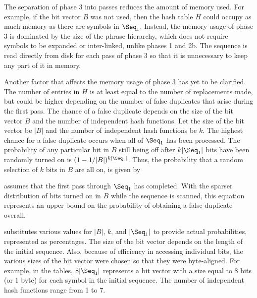 The separation of phase 3 into passes reduces the amount of
memory used.  For example, if the bit vector $B$ was not used,
then the hash table $H$ could occupy as much memory as 
there are symbols in $\Seq_1$.  Instead, the memory usage of
phase 3 is dominated by the size of the phrase hierarchy,
which does not require symbols to be expanded or inter-linked,
unlike phases 1 and 2b.  The sequence is read
directly from disk for each pass of phase 3 
so that it is unnecessary to keep any part of it in memory.

Another factor that affects the memory 
usage of phase 3 has yet to be clarified.  The number of
entries in $H$ is at least equal to the 
number of replacements made, but could be higher depending
on the number of false duplicates that arise during the first pass.  The
chance of a false duplicate depends on the size of the bit vector
$B$ and the number of independent hash functions.
Let the size of the bit vector be $|B|$ and the number of
independent hash functions be $k$.  The highest chance for
a false duplicate occurs when all of $\Seq_1$ has been
processed.  The probability of any particular bit in $B$ still being
off after $k|\Seq_1|$ bits have been randomly turned on is
$
    (
	    1 - 1/|B|
    )^{k|\Seq_1|}
$.
Thus, the probability that a random selection of $k$ bits in $B$
are all on, is given by

 assumes that the first pass through
$\Seq_1$ has completed.  With the sparser distribution of bits 
turned on in $B$ while the sequence is scanned, this equation
represents an upper bound on the probability of obtaining a false 
duplicate overall.

 substitutes various values for
$|B|$, $k$, and $|\Seq_1|$ to provide actual probabilities,
represented as percentages.
The size of the bit vector depends on the length of the 
initial sequence.  Also, because of efficiency in accessing
individual bits, the various sizes of the bit vector were 
chosen so
that they were byte-aligned.  For example, in the tables, 
$8|\Seq_1|$ represents a bit vector with a size equal to 8
bits (or 1 byte) for each symbol in the initial sequence.
The number of independent hash functions range from 1 to 7.


